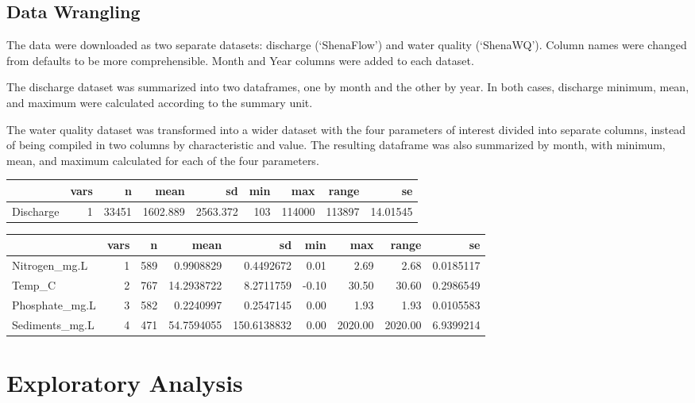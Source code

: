 \documentclass[
  12pt,
]{article}
\begin{document}
\hypertarget{data-wrangling}{%
\subsection{Data Wrangling}\label{data-wrangling}}

The data were downloaded as two separate datasets: discharge
(`ShenaFlow') and water quality (`ShenaWQ'). Column names were changed
from defaults to be more comprehensible. Month and Year columns were
added to each dataset.

The discharge dataset was summarized into two dataframes, one by month
and the other by year. In both cases, discharge minimum, mean, and
maximum were calculated according to the summary unit.

The water quality dataset was transformed into a wider dataset with the
four parameters of interest divided into separate columns, instead of
being compiled in two columns by characteristic and value. The resulting
dataframe was also summarized by month, with minimum, mean, and maximum
calculated for each of the four parameters.

\begin{longtable}[]{@{}lrrrrrrrr@{}}
\toprule
& vars & n & mean & sd & min & max & range & se \\
\midrule
\endhead
Discharge & 1 & 33451 & 1602.889 & 2563.372 & 103 & 114000 & 113897 &
14.01545 \\
\bottomrule
\end{longtable}

\begin{longtable}[]{@{}lrrrrrrrr@{}}
\toprule
& vars & n & mean & sd & min & max & range & se \\
\midrule
\endhead
Nitrogen\_mg.L & 1 & 589 & 0.9908829 & 0.4492672 & 0.01 & 2.69 & 2.68 &
0.0185117 \\
Temp\_C & 2 & 767 & 14.2938722 & 8.2711759 & -0.10 & 30.50 & 30.60 &
0.2986549 \\
Phosphate\_mg.L & 3 & 582 & 0.2240997 & 0.2547145 & 0.00 & 1.93 & 1.93 &
0.0105583 \\
Sediments\_mg.L & 4 & 471 & 54.7594055 & 150.6138832 & 0.00 & 2020.00 &
2020.00 & 6.9399214 \\
\bottomrule
\end{longtable}

\newpage

\hypertarget{exploratory-analysis}{%
\section{Exploratory Analysis}\label{exploratory-analysis}}
\end{document}
